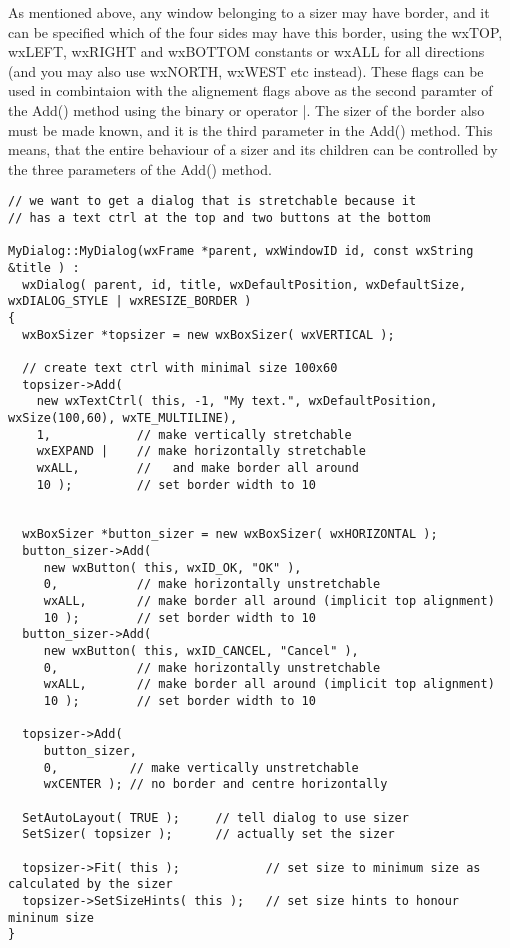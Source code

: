 As mentioned above, any window belonging to a sizer may have border, and it can be specified
which of the four sides may have this border, using the wxTOP, wxLEFT, wxRIGHT and wxBOTTOM
constants or wxALL for all directions (and you may also use wxNORTH, wxWEST etc instead). These
flags can be used in combintaion with the alignement flags above as the second paramter of the
Add() method using the binary or operator |. The sizer of the border also must be made known,
and it is the third parameter in the Add() method. This means, that the entire behaviour of
a sizer and its children can be controlled by the three parameters of the Add() method.

\begin{verbatim}
// we want to get a dialog that is stretchable because it
// has a text ctrl at the top and two buttons at the bottom

MyDialog::MyDialog(wxFrame *parent, wxWindowID id, const wxString &title ) :
  wxDialog( parent, id, title, wxDefaultPosition, wxDefaultSize, wxDIALOG_STYLE | wxRESIZE_BORDER )
{
  wxBoxSizer *topsizer = new wxBoxSizer( wxVERTICAL );
  
  // create text ctrl with minimal size 100x60
  topsizer->Add( 
    new wxTextCtrl( this, -1, "My text.", wxDefaultPosition, wxSize(100,60), wxTE_MULTILINE),
    1,            // make vertically stretchable
    wxEXPAND |    // make horizontally stretchable
    wxALL,        //   and make border all around
    10 );         // set border width to 10


  wxBoxSizer *button_sizer = new wxBoxSizer( wxHORIZONTAL );
  button_sizer->Add(
     new wxButton( this, wxID_OK, "OK" ), 
     0,           // make horizontally unstretchable
     wxALL,       // make border all around (implicit top alignment)
     10 );        // set border width to 10
  button_sizer->Add(
     new wxButton( this, wxID_CANCEL, "Cancel" ), 
     0,           // make horizontally unstretchable
     wxALL,       // make border all around (implicit top alignment)
     10 );        // set border width to 10
  
  topsizer->Add( 
     button_sizer,
     0,          // make vertically unstretchable
     wxCENTER ); // no border and centre horizontally

  SetAutoLayout( TRUE );     // tell dialog to use sizer
  SetSizer( topsizer );      // actually set the sizer

  topsizer->Fit( this );            // set size to minimum size as calculated by the sizer
  topsizer->SetSizeHints( this );   // set size hints to honour mininum size
}
\end{verbatim}


